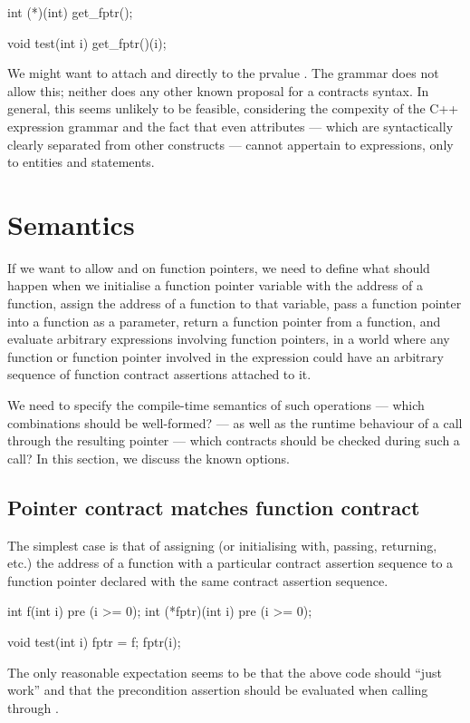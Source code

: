 \begin{codeblock}
int (*)(int) get_fptr();

void test(int i) {
  get_fptr()(i);
}
\end{codeblock}
We might want to attach  and  directly to the prvalue . The \cite{P2900R8} grammar does not allow this; neither does any other known proposal for a contracts syntax. In general, this seems unlikely to be feasible, considering the compexity of the C++ expression grammar and the fact that even attributes --- which are syntactically clearly separated from other constructs --- cannot appertain to expressions, only to entities and statements.


\section{Semantics}
\label{semantics}

If we want to allow  and  on function pointers, we need to define what should happen when we initialise a function pointer variable with the address of a function, assign the address of a function to that variable, pass a function pointer into a function as a parameter, return a function pointer from a function, and evaluate arbitrary expressions involving function pointers, in a world where any function or function pointer involved in the expression could have an arbitrary sequence of function contract assertions attached to it.

We need to specify the compile-time semantics of such operations --- which combinations should be well-formed? --- as well as the runtime behaviour of a call through the resulting pointer --- which contracts should be checked during such a call? In this section, we discuss the known options.


\subsection{Pointer contract matches function contract}
\label{matching}

The simplest case is that of assigning (or initialising with, passing, returning, etc.) the address of a function with a particular contract assertion sequence to a function pointer declared with the same contract assertion sequence. 
\begin{codeblock}
int f(int i) pre (i >= 0);
int (*fptr)(int i) pre (i >= 0);

void test(int i) {
  fptr = f; 
  fptr(i); 
}
\end{codeblock}
The only reasonable expectation seems to be that the above code should ``just work'' and that the precondition assertion  should be evaluated when calling  through .

